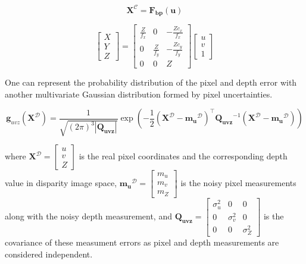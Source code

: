 \documentclass[a4paper]{report}
\numberwithin{figure}{section}
\begin{document}
\begin{equation} \mathbf{X}^{\mathcal{C}} = \mathbf{F_{bp}}(\mathbf{u})
\end{equation}

\begin{equation} \begin{bmatrix} X \\ Y \\ Z \end{bmatrix} = \begin{bmatrix}
\frac{Z}{f_x} & 0 & -\frac{Z c_x}{f_x} \\ 0 & \frac{Z}{f_y} & -\frac{Z
c_y}{f_y} \\ 0 & 0 & Z \end{bmatrix} \begin{bmatrix} u \\ v \\ 1 \end{bmatrix}
\end{equation}

One can represent the probability distribution of the pixel and depth error
with another multivariate Gaussian distribution formed by pixel uncertainties. 

\begin{equation} \mathbf{g}_{uvz}(\mathbf{X}^{\mathcal{D}}) =
\frac{1}{\sqrt{(2\pi)^3|\mathbf{Q_{uvz}}|}} \exp(-\frac{1}{2}
(\mathbf{X}^{\mathcal{D}}-\mathbf{m_u}^{\mathcal{D}})^\top
\mathbf{Q_{uvz}}^{-1} (\mathbf{X}^{\mathcal{D}}-\mathbf{m_u}^{\mathcal{D}}))
\end{equation} \label{eq:cov_ellipse}

where $\mathbf{X}^{\mathcal{D}} = \begin{bmatrix} u \\ v \\ Z\end{bmatrix}$ is
the real pixel coordinates and the corresponding depth value in disparity image
space, $\mathbf{m_u}^{\mathcal{D}} = \begin{bmatrix} m_u \\ m_v \\ m_Z
\end{bmatrix}$ is the noisy pixel measurements along with the noisy depth
measurement, and $\mathbf{Q_{uvz}} = \begin{bmatrix} \sigma_u^2 & 0 & 0\\ 0 &
\sigma_v^2 & 0 \\ 0 & 0 & \sigma_Z^2\end{bmatrix}$ is the covariance of these
measument errors as pixel and depth measurements are considered independent.
\end{document}

